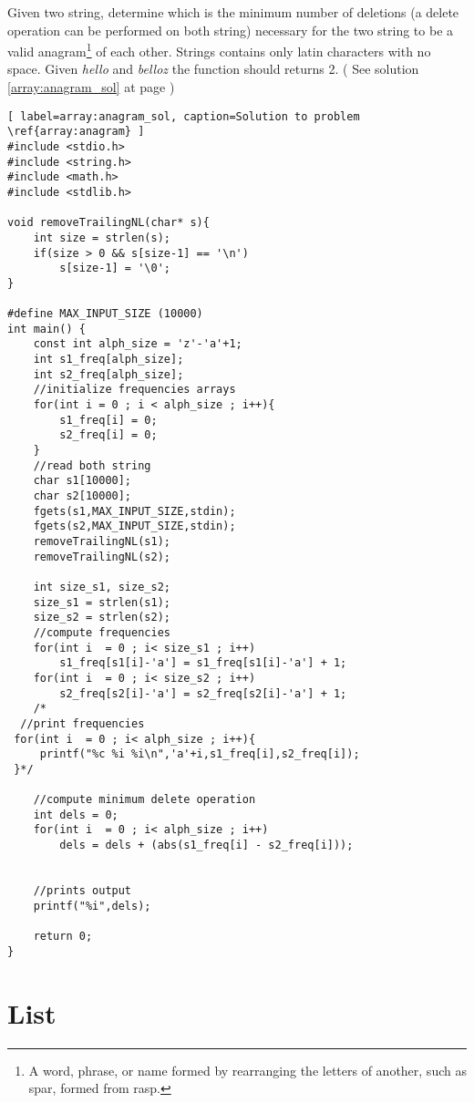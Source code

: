 \begin{problem}\label{array:anagram}
Given two string, determine which is the minimum number of deletions (a delete operation can be performed on both string) necessary for the two string to be a valid anagram\footnote{A word, phrase, or name formed by rearranging the letters of another, such as spar, formed from rasp.} of each other. Strings contains only latin characters with no space. Given \textit{hello} and \textit{belloz} the function should returns 2. ( See solution \ref{array:anagram_sol} at page \pageref{array:anagram_sol} )


\begin{lstlisting}[ label=array:anagram_sol, caption=Solution to problem \ref{array:anagram} ]
#include <stdio.h>
#include <string.h>
#include <math.h>
#include <stdlib.h>

void removeTrailingNL(char* s){
    int size = strlen(s);
    if(size > 0 && s[size-1] == '\n')
        s[size-1] = '\0';
}

#define MAX_INPUT_SIZE (10000)
int main() {
    const int alph_size = 'z'-'a'+1;
    int s1_freq[alph_size];
    int s2_freq[alph_size];
    //initialize frequencies arrays
    for(int i = 0 ; i < alph_size ; i++){
        s1_freq[i] = 0;
        s2_freq[i] = 0;
    }
    //read both string
    char s1[10000];
    char s2[10000];
    fgets(s1,MAX_INPUT_SIZE,stdin);
    fgets(s2,MAX_INPUT_SIZE,stdin);
    removeTrailingNL(s1);
    removeTrailingNL(s2);
    
    int size_s1, size_s2;
    size_s1 = strlen(s1);
    size_s2 = strlen(s2);
    //compute frequencies
    for(int i  = 0 ; i< size_s1 ; i++)
        s1_freq[s1[i]-'a'] = s1_freq[s1[i]-'a'] + 1;
    for(int i  = 0 ; i< size_s2 ; i++)
        s2_freq[s2[i]-'a'] = s2_freq[s2[i]-'a'] + 1;
    /*
  //print frequencies  
 for(int i  = 0 ; i< alph_size ; i++){
     printf("%c %i %i\n",'a'+i,s1_freq[i],s2_freq[i]);
 }*/
    
    //compute minimum delete operation
    int dels = 0;
    for(int i  = 0 ; i< alph_size ; i++)
        dels = dels + (abs(s1_freq[i] - s2_freq[i]));
    
    
    //prints output
    printf("%i",dels);
   
    return 0;
}
\end{lstlisting}
 \end{problem}






\chapter{List}
